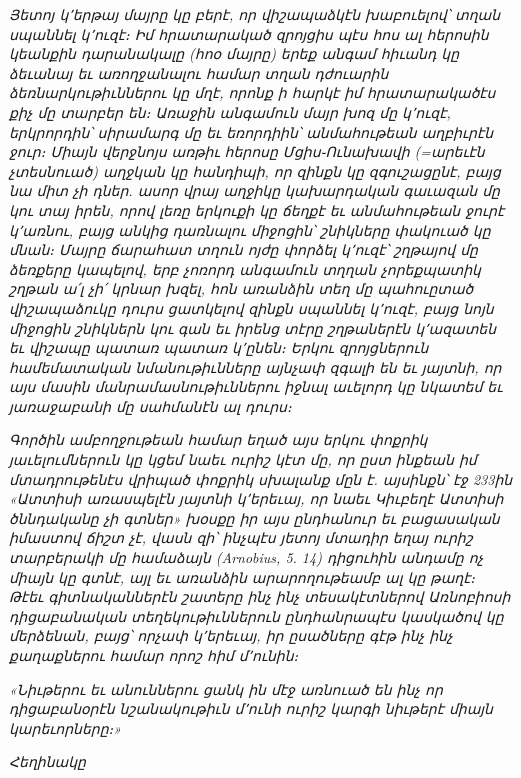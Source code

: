 \documentclass{article}
\begin{document}
{\emph{Յետոյ կ՚երթայ մայրը կը բերէ, որ վիշապաձկէն խաբուելով՝ տղան սպաննել կ՚ուզէ։ Իմ հրատարակած զրոյցիս պէս հոս ալ հերոսին կեանքին դարանակալը (հոօ մայրը) երեք անգամ հիւանդ կը ձեւանայ եւ առողջանալու համար տղան դժուարին ձեռնարկութիւններու կը մղէ, որոնք ի հարկէ իմ հրատարակածէս քիչ մը տարբեր են։ Առաջին անգամուն մայր խոզ մը կ՚ուզէ, երկրորդին՝ սիրամարգ մը եւ եռորդիին՝ անմահութեան աղբիւրէն ջուր։ Միայն վերջնոյս առթիւ հերոսը Մցիս֊Ունախավի (=արեւէն չտեսնուած) աղջկան կը հանդիպի, որ զինքն կը զգուշացընէ, բայց նա միտ չի դներ. ասոր վրայ աղջիկը կախարդական գաւազան մը կու տայ իրեն, որով լեռը երկուքի կը ճեղքէ եւ անմահութեան ջուրէ կ՚առնու, բայց անկից դառնալու միջոցին՝ շնիկները փակուած կը մնան։ Մայրը ճարահատ տղուն ոյժը փորձել կ՚ուզէ՝ շղթայով մը ձեռքերը կապելով, երբ չոռորդ անգամուն տղղան չորեքպատիկ շղթան ա՛լ չի՛ կրնար խզել, հոն առանձին տեղ մը պահուըտած վիշապաձուկը դուրս ցատկելով զինքն սպաննել կ՚ուզէ, բայց նոյն միջոցին շնիկներն կու գան եւ իրենց տէրը շղթաներէն կ՚ազատեն եւ վիշապը պատառ պատառ կ՚ընեն։ Երկու զրոյցներուն համեմատական նմանութիւնները այնչափ զգալի են եւ յայտնի, որ այս մասին մանրամասնութիւններու իջնալ աւելորդ կը նկատեմ եւ յառաջաբանի մը սահմանէն ալ դուրս։}

\emph{Գործին ամբողջութեան համար եղած այս երկու փոքրիկ յաւելումներուն կը կցեմ նաեւ ուրիշ կէտ մը, որ ըստ ինքեան իմ մտադրութենէս վրիպած փոքրիկ սխալանք մըն է. այսինքն՝ էջ 233ին «Ատտիսի առասպելէն յայտնի կ՚երեւայ, որ նաեւ Կիւբեղէ Ատտիսի ծննդականը չի գտներ» խօսքը իր այս ընդհանուր եւ բացասական իմաստով ճիշտ չէ, վասն զի՝ ինչպէս յետոյ մտադիր եղայ ուրիշ տարբերակի մը համաձայն (Arnobius, 5. 14) դիցուհին անդամը ոչ միայն կը գտնէ, այլ եւ առանձին արարողութեամբ ալ կը թաղէ։ Թէեւ գիտնականներէն շատերը ինչ ինչ տեսակէտներով Առնոբիոսի դիցաբանական տեղեկութիւններուն ընդհանրապէս կասկածով կը մերձենան, բայց՝ որչափ կ՚երեւայ, իր ըսածները գէթ ինչ ինչ քաղաքներու համար որոշ հիմ մ՚ունին։}

\emph{«Նիւթերու եւ անուններու ցանկ ին մէջ առնուած են ինչ որ դիցաբանօրէն նշանակութիւն մ՚ունի ուրիշ կարգի նիւթերէ միայն կարեւորները։»}

\bigskip

\emph{Հեղինակը}
}
\clearpage
\section*{}
\normalsize
\end{document}
